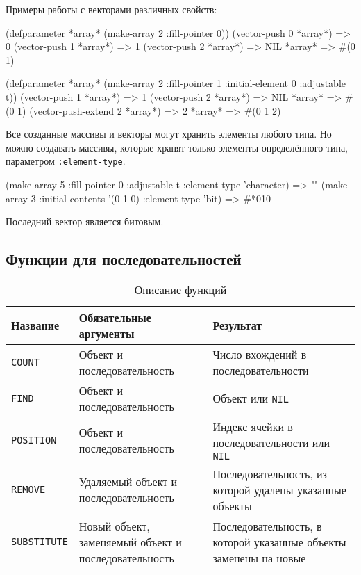 Примеры работы с векторами различных свойств:
\begin{cllst}{}{}
(defparameter *array* (make-array 2 :fill-pointer 0))
(vector-push 0 *array*) => 0
(vector-push 1 *array*) => 1
(vector-push 2 *array*) => NIL
*array* => #(0 1)

(defparameter *array*
  (make-array 2 :fill-pointer 1 :initial-element 0 :adjustable t))
(vector-push 1 *array*) => 1
(vector-push 2 *array*) => NIL
*array* => #(0 1)
(vector-push-extend 2 *array*) => 2
*array* => #(0 1 2)
\end{cllst}

Все созданные массивы и векторы могут хранить элементы любого типа. Но можно создавать массивы, которые хранят только элементы определённого типа, параметром \lstinline{:element-type}.
\begin{cllst}{}{}
(make-array 5 :fill-pointer 0 :adjustable t :element-type 'character) => ""
(make-array 3 :initial-contents '(0 1 0) :element-type 'bit) => #*010
\end{cllst}

Последний вектор является битовым.

\subsection{Функции для последовательностей}
\begin{table}[h!]
  \caption{Описание функций}
  \begin{center}
    \begin{tabular}{lp{5cm}p{6.5cm}}
      \toprule
      Название & Обязательные аргументы & Результат \\
      \midrule
      \texttt{COUNT} & Объект и последовательность & Число вхождений в последовательности \\
      \texttt{FIND} & Объект и последовательность & Объект или \texttt{NIL} \\
      \texttt{POSITION} & Объект и последовательность & Индекс ячейки в последовательности или \texttt{NIL} \\
      \texttt{REMOVE} & Удаляемый объект и последовательность & Последовательность, из которой удалены указанные объекты \\
      \texttt{SUBSTITUTE} & Новый объект, заменяемый объект и последовательность & Последовательность, в которой указанные объекты заменены на новые \\
      \bottomrule
    \end{tabular}
  \end{center}
\end{table}

